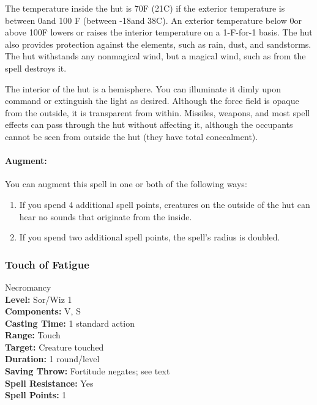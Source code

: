 The temperature inside the hut is 70\textdegree F (21\textdegree C) if the exterior temperature is between 0\textdegree and 100 F
(between -18\textdegree and 38\textdegree C).
An exterior temperature below 0\textdegree or above 100\textdegree F lowers or raises the interior temperature on a 1-\textdegree F-for-1 basis. 
The hut also provides protection against the elements, such as rain, dust, and sandstorms. 
The hut withstands any nonmagical wind, but a magical wind, such as from the 
 spell destroys it.

The interior of the hut is a hemisphere. 
You can illuminate it dimly upon command or extinguish the light as desired. 
Although the force field is opaque from the outside, 
it is transparent from within. 
Missiles, weapons, and most spell effects can pass through the hut without affecting it, 
although the occupants cannot be seen from outside the hut (they have total concealment).

\paragraph{Augment:} You can augment this spell in one or both of the following ways:
\begin{enumerate}
 \item If you spend 4 additional spell points, creatures on the outside of the hut can hear no sounds that originate from the inside.
 \item If you spend two additional spell points, the spell's radius is doubled.
\end{enumerate}

\subsubsection{Touch of Fatigue}
\label{Spell:TouchOfFatigue}
Necromancy
\\ \textbf{Level:} Sor/Wiz 1
\\ \textbf{Components:} V, S
\\ \textbf{Casting Time:} 1 standard action
\\ \textbf{Range:} Touch
\\ \textbf{Target:} Creature touched
\\ \textbf{Duration:} 1 round/level
\\ \textbf{Saving Throw:} Fortitude negates; see text
\\ \textbf{Spell Resistance:} Yes
\\ \textbf{Spell Points:} 1

